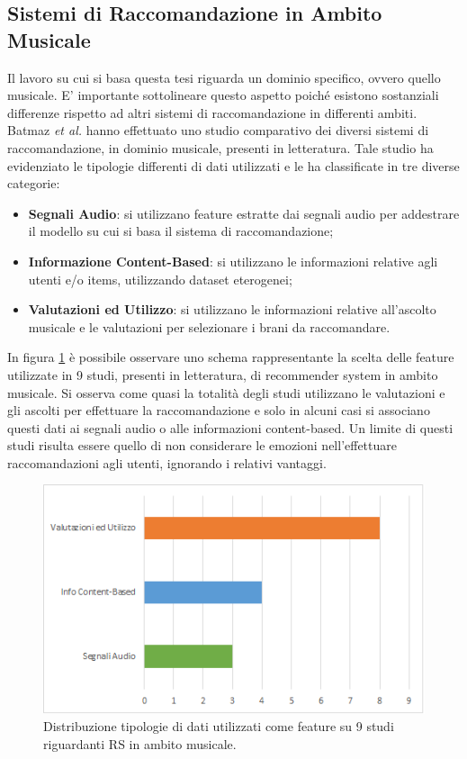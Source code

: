 \documentclass[11pt]{report}
\begin{document}
\subsection{Sistemi di Raccomandazione in Ambito Musicale}

Il lavoro su cui si basa questa tesi riguarda un dominio specifico, ovvero quello musicale. E' importante sottolineare questo aspetto poiché esistono sostanziali differenze rispetto ad altri sistemi di raccomandazione in differenti ambiti.
Batmaz \textit{et al.} \cite{deep-re-sys-survey} hanno effettuato uno studio comparativo dei diversi sistemi di raccomandazione, in dominio musicale, presenti in letteratura. Tale studio ha evidenziato le tipologie differenti di dati utilizzati e le ha classificate in tre diverse categorie: 
\begin{itemize}
    \item \textbf{Segnali Audio}: si utilizzano feature estratte dai segnali audio per addestrare il modello su cui si basa il sistema di raccomandazione;
    
    \item \textbf{Informazione Content-Based}: si utilizzano le informazioni relative agli utenti e/o items, utilizzando dataset eterogenei;
    
    \item \textbf{Valutazioni ed Utilizzo}: si utilizzano le informazioni relative all'ascolto musicale e le valutazioni per selezionare i brani da raccomandare.
\end{itemize}
In figura \ref{fig:musical-RS} è possibile osservare uno schema rappresentante la scelta delle feature utilizzate in 9 studi, presenti in letteratura, di recommender system in ambito musicale. Si osserva come quasi la totalità degli studi utilizzano le valutazioni e gli ascolti per effettuare la raccomandazione e solo in alcuni casi si associano questi dati ai segnali audio o alle informazioni content-based. Un limite di questi studi risulta essere quello di non considerare le emozioni nell'effettuare raccomandazioni agli utenti, ignorando i relativi vantaggi.

\vspace{1cm}

\begin{figure}[h!]
	 	\centering
	 	\includegraphics[scale = 0.95]{img/survery-RS.png}
	 	\caption{Distribuzione tipologie di dati utilizzati come feature su 9 studi riguardanti RS in ambito musicale.\cite{deep-re-sys-survey}}
	 	\label{fig:musical-RS}
\end{figure}
\end{document}

